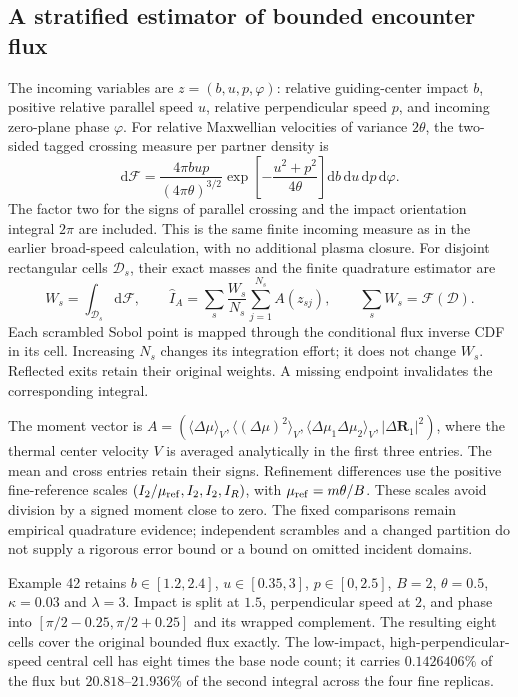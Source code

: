 \documentclass[11pt,letterpaper]{article}
\newcommand{\dd}{\mathrm d}
\begin{document}
\subsection*{A stratified estimator of bounded encounter flux}
The incoming variables are $z=(b,u,p,\varphi)$: relative guiding-center
impact $b$, positive relative parallel speed $u$, relative perpendicular
speed $p$, and incoming zero-plane phase $\varphi$. For relative Maxwellian
velocities of variance $2\theta$, the two-sided tagged crossing measure per
partner density is
\[
 \dd\mathcal F=
 \frac{4\pi bup}{(4\pi\theta)^{3/2}}
 \exp\!\left[-\frac{u^2+p^2}{4\theta}\right]
 \dd b\,\dd u\,\dd p\,\dd\varphi.
\]
The factor two for the signs of parallel crossing and the impact orientation
integral $2\pi$ are included. This is the same finite incoming measure as
in the earlier broad-speed calculation, with no additional plasma closure.
For disjoint rectangular cells $\mathcal D_s$, their exact masses and the
finite quadrature estimator are
\[
 W_s=\int_{\mathcal D_s}\dd\mathcal F,\qquad
 \widehat I_A=\sum_s\frac{W_s}{N_s}
                  \sum_{j=1}^{N_s}A(z_{sj}),\qquad
 \sum_sW_s=\mathcal F(\mathcal D).
\]
Each scrambled Sobol point is mapped through the conditional flux inverse
CDF in its cell. Increasing $N_s$ changes its integration effort; it does
not change $W_s$. Reflected exits retain their original weights. A missing
endpoint invalidates the corresponding integral.

The moment vector is
$A=(\langle\Delta\mu\rangle_V,
\langle(\Delta\mu)^2\rangle_V,
\langle\Delta\mu_1\Delta\mu_2\rangle_V,
|\Delta\bm R_1|^2)$, where the thermal center velocity $V$ is averaged
analytically in the first three entries. The mean and cross entries retain
their signs. Refinement differences use the positive fine-reference scales
$(I_2/\mu_{\rm ref},I_2,I_2,I_R)$, with
$\mu_{\rm ref}=m\theta/B$. These scales avoid division by a signed moment
close to zero. The fixed comparisons remain empirical quadrature evidence;
independent scrambles and a changed partition do not supply a rigorous error
bound or a bound on omitted incident domains.

Example 42 retains $b\in[1.2,2.4]$, $u\in[0.35,3]$, $p\in[0,2.5]$,
$B=2$, $\theta=0.5$, $\kappa=0.03$ and $\lambda=3$.
Impact is split at $1.5$, perpendicular speed at $2$, and phase into
$[\pi/2-0.25,\pi/2+0.25]$ and its wrapped complement. The resulting eight
cells cover the original bounded flux exactly. The low-impact,
high-perpendicular-speed central cell has eight times the base node count;
it carries $0.1426406\%$ of the flux but $20.818$--$21.936\%$ of the second
integral across the four fine replicas.
\end{document}
